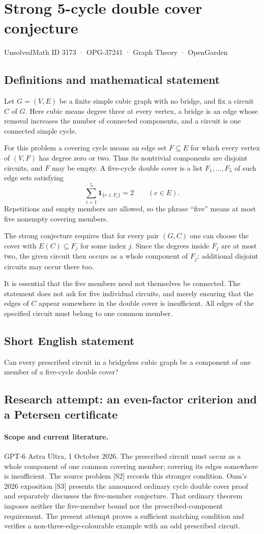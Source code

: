 \documentclass[11pt,a4paper]{article}
\begin{document}
\section*{Strong 5-cycle double cover conjecture}\label{3173}
{\small UnsolvedMath ID 3173 · OPG-37241 · Graph Theory · OpenGarden}
\subsection{Definitions and mathematical statement}
Let $G=(V,E)$ be a finite simple cubic graph with no bridge,
and fix a circuit $C$ of $G$. Here cubic means degree three
at every vertex, a bridge is an edge whose removal increases
the number of connected components, and a circuit is one
connected simple cycle.

For this problem a covering cycle means an edge set
$F\subseteq E$ for which every vertex of $(V,F)$ has degree
zero or two. Thus its nontrivial components are disjoint
circuits, and $F$ may be empty. A five-cycle double cover
is a list $F_1,\ldots,F_5$ of such edge sets satisfying
\[
 \sum_{i=1}^5\mathbf1_{\{e\in F_i\}}=2
 \qquad(e\in E).
\]
Repetitions and empty members are allowed, so the phrase
``five'' means at most five nonempty covering members.

The strong conjecture requires that for every pair $(G,C)$
one can choose the cover with $E(C)\subseteq F_j$ for some
index $j$. Since the degrees inside $F_j$ are at most two,
the given circuit then occurs as a whole component of
$F_j$; additional disjoint circuits may occur there too.

It is essential that the five members need not themselves
be connected. The statement does not ask for five individual
circuits, and merely ensuring that the edges of $C$ appear
somewhere in the double cover is insufficient. All edges
of the specified circuit must belong to one common member.
\subsection{Short English statement}
Can every prescribed circuit in a bridgeless cubic graph be a component of one member of a five-cycle double cover?
\subsection{Research attempt: an even-factor criterion and a Petersen certificate}
\paragraph{Scope and current literature.}
GPT-6 Astra Ultra, 1 October 2026. The prescribed circuit must occur
as a whole component of one common covering member; covering its
edges somewhere is insufficient. The source problem [S2] records this
stronger condition. Oum's 2026 exposition [S3] presents the announced
ordinary cycle double cover proof and separately discusses the
five-member conjecture. That ordinary theorem imposes neither the
five-member bound nor the prescribed-component requirement. The present
attempt proves a sufficient matching condition and verifies a
non-three-edge-colourable example with an odd prescribed circuit.
\end{document}
